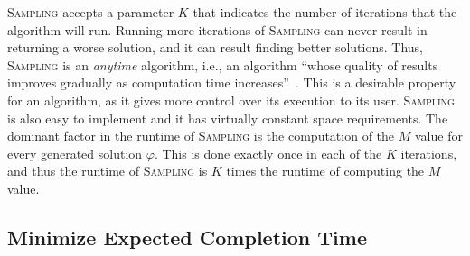 \documentclass[letterpaper]{article} %
\newcommand{\tuple}[1]{\langle#1\rangle}
\newcommand{\samd}{\ac{SAMD}\xspace}
\newcommand{\sampling}{\textsc{Sampling}\xspace}
\newcommand{\expectation}{\textsc{Expectation}\xspace}
\begin{document}
\sampling accepts a parameter $K$ that indicates the number of iterations that the algorithm will run. Running more iterations of \sampling can never result in returning a worse solution, and it can result finding better solutions. Thus, \sampling is an \emph{anytime} algorithm, i.e., an algorithm
``whose quality of results improves gradually as computation time increases''~\cite{zilberstein1996using}. This is a desirable property for an algorithm, as it gives more control over its execution to its user. 
 \sampling is also easy to implement and it has virtually constant space requirements. The dominant factor in the runtime of \sampling is the computation of the $M$ value for every generated solution $\varphi$. This is done exactly once in each of the $K$ iterations, and thus the runtime of \sampling is $K$ times the runtime of computing the $M$ value. 





 

\subsection{Minimize Expected Completion Time}\label{sec:expect}

\end{document}
